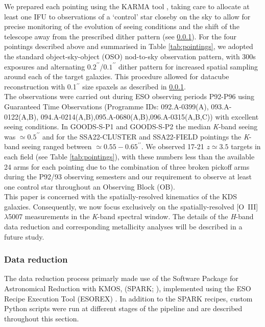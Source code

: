 \documentclass[fleqn,usenatbib]{mnras}
\begin{document}
We prepared each pointing using the KARMA tool \citep{Wegner2008}, taking care to allocate at least one IFU to observations of a `control' star closeby on the sky to allow for precise monitoring of the evolution of seeing conditions and the shift of the telescope away from the prescribed dither pattern (see \cref{subsubsec:datareduction}).
For the four pointings described above and summarised in Table \ref{tab:pointings}, we adopted the standard object-sky-object (OSO) nod-to-sky observation pattern, with 300s exposures and alternating $0.2^{\prime\prime}$/$0.1^{\prime\prime}$ dither pattern for increased spatial sampling around each of the target galaxies.
This procedure allowed for datacube reconstruction with 0.1$^{\prime\prime}$ size spaxels as described in \cref{subsubsec:datareduction}. \\

The observations were carried out during ESO observing periods P92-P96 using Guaranteed Time Observations (Programme IDs: 092.A-0399(A), 093.A-0122(A,B), 094.A-0214(A,B),095.A-0680(A,B),096.A-0315(A,B,C)) with excellent seeing conditions.
In GOODS-S-P1 and GOODS-S-P2 the median {\it K}-band seeing was $\simeq0.5^{\prime\prime}$ and for the SSA22-CLUSTER and SSA22-FIELD pointings the {\it K}-band seeing ranged between $\simeq0.55-0.65^{\prime\prime}$.
We observed 17-21 $z\simeq3.5$ targets in each field (see Table \ref{tab:pointings}), with these numbers less than the available 24 arms for each pointing due to the combination of three broken pickoff arms during the P92/93 observing semesters and our requirement to observe at least one control star throughout an Observing Block (OB). \\

This paper is concerned with the spatially-resolved kinematics of the KDS galaxies.
Consequently, we now focus exclusively on the spatially-resolved [O~{\sc III}]$\lambda$5007 measurements in the {\it K}-band spectral window. 
The details of the {\it H}-band data reduction and corresponding metallicity analyses will be described in a future study.

\subsubsection{Data reduction}\label{subsubsec:datareduction}

The data reduction process primarly made use of the Software Package for Astronomical Reduction with KMOS, (SPARK; \citealt{Davies2013}), implemented using the ESO Recipe Execution Tool (ESOREX) \citep{Freudling2013}.
In addition to the SPARK recipes, custom Python scripts were run at different stages of the pipeline and are described throughout this section.
\end{document}
